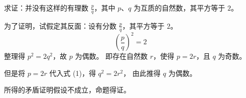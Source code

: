 \documentclass{ctexart}
\begin{document}
求证：并没有这样的有理数 $\frac{p}{q}$，其中 $p$、$q$ 为互质的自然数，其平方等于
$2$。

为了证明，试假定其反面：设有分数 $\frac{p}{q}$，其平方等于 $2$。
\begin{equation}
\left( \frac{p}{q}\right)^2 = 2
\end{equation}
整理得 $p^2=2q^2$，故 $p$ 为偶数。
即存在自然数 $r$，使得 $p = 2r$，且 $q$ 为奇数。

但是将 $p = 2r$ 代入式 (1)，得 $q^2 = 2r^2$，
由此推得 $q$ 为偶数。

所得的矛盾证明假设不成立，命题得证。
    
\end{document}

